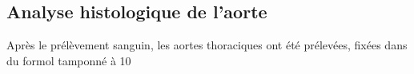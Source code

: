 \subsection{Analyse histologique de l'aorte}
Après le prélèvement sanguin, les aortes thoraciques ont été prélevées, fixées dans du formol tamponné à 10%
